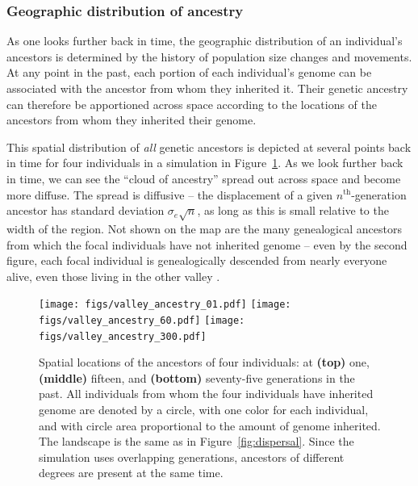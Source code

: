 \documentclass{ar-1col}
\newcommand{\todo}[1]{{\textbf{\color{red}{#1}}}}
\begin{document}
\subsubsection{Geographic distribution of ancestry}

\todo{estimation section? or parallel structure with other sections?}

As one looks further back in time,
the geographic distribution of an individual's ancestors
is determined by the history of population size changes and movements.
At any point in the past,
each portion of each individual's genome can be associated 
with the ancestor from whom they inherited it.
Their genetic ancestry can therefore be apportioned across space according
to the locations of the ancestors from whom they inherited their genome.

This spatial distribution of \textit{all} genetic ancestors is depicted 
at several points back in time
for four individuals in a simulation in Figure~\ref{ancestry_spread}.
As we look further back in time,
we can see the ``cloud of ancestry'' spread out across space
and become more diffuse.
The spread is diffusive --
the displacement of a given $n^\text{th}$-generation ancestor 
has standard deviation $\sigma_e \sqrt{n}$,
as long as this is small relative to the width of the region.
Not shown on the map are the many genealogical ancestors
from which the focal individuals have not inherited genome --
even by the second figure,
each focal individual is genealogically descended from nearly everyone alive,
even those living in the other valley \citep{chang1999}.

\begin{figure}	%
        \texttt{[image: figs/valley\_ancestry\_01.pdf]}
        \texttt{[image: figs/valley\_ancestry\_60.pdf]}
        \texttt{[image: figs/valley\_ancestry\_300.pdf]}
        \caption{
            Spatial locations of the ancestors of four individuals:
            at 
            \textbf{(top)} one, 
            \textbf{(middle)} fifteen, and
            \textbf{(bottom)} seventy-five generations in the past.
            All individuals from whom the four individuals have inherited genome are denoted by a circle,
            with one color for each individual,
            and with circle area proportional to the amount of genome inherited.
            The landscape is the same as in Figure~\ref{fig:dispersal}.
            Since the simulation uses overlapping generations,
            ancestors of different degrees are present at the same time.
        }
        \label{ancestry_spread}
\end{figure}
\end{document}
